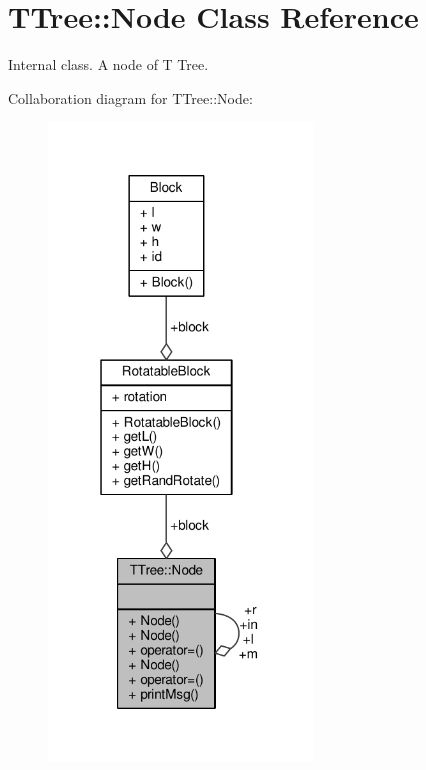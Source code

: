 \hypertarget{classTTree_1_1Node}{}\section{T\+Tree\+:\+:Node Class Reference}
\label{classTTree_1_1Node}


Internal class. A node of T Tree.  




Collaboration diagram for T\+Tree\+:\+:Node\+:
\nopagebreak
\begin{figure}[H]
\begin{center}
\leavevmode
\includegraphics[width=199pt]{classTTree_1_1Node__coll__graph}
\end{center}
\end{figure}
